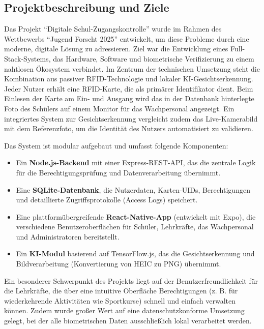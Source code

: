 \subsection{Projektbeschreibung und Ziele} \label{subsec:projektbeschreibung}
Das Projekt \enquote{Digitale Schul-Zugangskontrolle} wurde im Rahmen des Wettbewerbs \enquote{Jugend Forscht 2025} entwickelt, um diese Probleme durch eine moderne, digitale Lösung zu adressieren. Ziel war die Entwicklung eines Full-Stack-Systems, das Hardware, Software und biometrische Verifizierung zu einem nahtlosen Ökosystem verbindet. Im Zentrum der technischen Umsetzung steht die Kombination aus passiver RFID-Technologie und lokaler KI-Gesichtserkennung. Jeder Nutzer erhält eine RFID-Karte, die als primärer Identifikator dient. Beim Einlesen der Karte am Ein- und Ausgang wird das in der Datenbank hinterlegte Foto des Schülers auf einem Monitor für das Wachpersonal angezeigt. Ein integriertes System zur Gesichtserkennung vergleicht zudem das Live-Kamerabild mit dem Referenzfoto, um die Identität des Nutzers automatisiert zu validieren.

Das System ist modular aufgebaut und umfasst folgende Komponenten:
\begin{itemize}
    \item Ein \textbf{Node.js-Backend} mit einer Express-REST-API, das die zentrale Logik für die Berechtigungsprüfung und Datenverarbeitung übernimmt.
    \item Eine \textbf{SQLite-Datenbank}, die Nutzerdaten, Karten-UIDs, Berechtigungen und detaillierte Zugriffsprotokolle (Access Logs) speichert.
    \item Eine plattformübergreifende \textbf{React-Native-App} (entwickelt mit Expo), die verschiedene Benutzeroberflächen für Schüler, Lehrkräfte, das Wachpersonal und Administratoren bereitstellt.
    \item Ein \textbf{KI-Modul} basierend auf TensorFlow.js, das die Gesichtserkennung und Bildverarbeitung (Konvertierung von HEIC zu PNG) übernimmt.
\end{itemize}
Ein besonderer Schwerpunkt des Projekts liegt auf der Benutzerfreundlichkeit für die Lehrkräfte, die über eine intuitive Oberfläche Berechtigungen (z. B. für wiederkehrende Aktivitäten wie Sportkurse) schnell und einfach verwalten können. Zudem wurde großer Wert auf eine datenschutzkonforme Umsetzung gelegt, bei der alle biometrischen Daten ausschließlich lokal verarbeitet werden.

